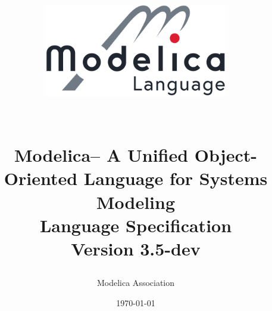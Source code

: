

\newcommand{\crefnameref}[1]{\cref{#1}~\emph{\nameref*{#1}}}
\newcommand{\Crefnameref}[1]{\Cref{#1}~\emph{\nameref*{#1}}}


\newenvironment{contributors}{%
\list{}{%
\setlength{\leftmargin}{1.5em}%
\setlength{\itemsep}{-\parskip}%
\addtolength{\itemsep}{2pt}%
}%
}{%
\endlist
}

\title{
\ifpdf
\begin{center}
\includegraphics[width=8cm]{Modelica_Language}
\end{center}
~\\[2\baselineskip]
\fi
Modelica\textsuperscript\textregistered -- A Unified Object-Oriented Language for Systems
Modeling\\[2\baselineskip]
Language Specification\\[2\baselineskip]
Version 3.5-dev}
\date{\today}
\author{Modelica Association}
